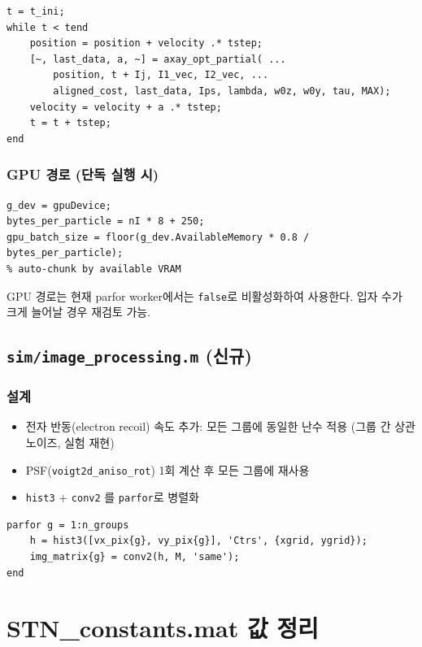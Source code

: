 \documentclass[11pt, a4paper]{article}
\begin{document}
\begin{lstlisting}
t = t_ini;
while t < tend
    position = position + velocity .* tstep;
    [~, last_data, a, ~] = axay_opt_partial( ...
        position, t + Ij, I1_vec, I2_vec, ...
        aligned_cost, last_data, Ips, lambda, w0z, w0y, tau, MAX);
    velocity = velocity + a .* tstep;
    t = t + tstep;
end
\end{lstlisting}

\subsubsection{GPU 경로 (단독 실행 시)}

\begin{lstlisting}
g_dev = gpuDevice;
bytes_per_particle = nI * 8 + 250;
gpu_batch_size = floor(g_dev.AvailableMemory * 0.8 / bytes_per_particle);
% auto-chunk by available VRAM
\end{lstlisting}

GPU 경로는 현재 parfor worker에서는 \texttt{false}로 비활성화하여 사용한다.
입자 수가 크게 늘어날 경우 재검토 가능.

\subsection{\texttt{sim/image\_processing.m} (신규)}

\subsubsection{설계}

\begin{itemize}
  \item 전자 반동(electron recoil) 속도 추가: 모든 그룹에 동일한 난수 적용
        (그룹 간 상관 노이즈, 실험 재현)
  \item PSF(\texttt{voigt2d\_aniso\_rot}) 1회 계산 후 모든 그룹에 재사용
  \item \texttt{hist3} + \texttt{conv2} 를 \texttt{parfor}로 병렬화
\end{itemize}

\begin{lstlisting}
parfor g = 1:n_groups
    h = hist3([vx_pix{g}, vy_pix{g}], 'Ctrs', {xgrid, ygrid});
    img_matrix{g} = conv2(h, M, 'same');
end
\end{lstlisting}

\section{STN\_constants.mat 값 정리}
\end{document}

